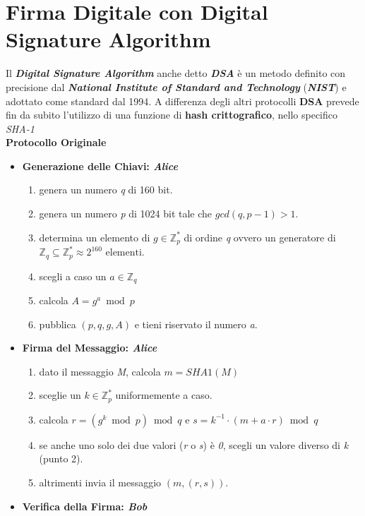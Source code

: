 \section{Firma Digitale con Digital Signature Algorithm}
Il \textbf{\textit{Digital Signature Algorithm}} anche detto \textbf{\textit{DSA}} è un metodo definito con precisione dal \textbf{\textit{National Institute of Standard and Technology}} (\textbf{\textit{NIST}}) e adottato come standard dal 1994. A differenza degli altri protocolli \textbf{DSA} prevede fin da subito l'utilizzo di una funzione di \textbf{hash crittografico}, nello specifico \textit{SHA-1}
\\ \newline
\textbf{Protocollo Originale}
\begin{itemize}
    \item \textbf{Generazione delle Chiavi: \textit{Alice}}
    \begin{enumerate}
        \item genera un numero \textit{q} di 160 bit.
        \item genera un numero \textit{p} di 1024 bit tale che $gcd(q, p - 1) > 1$.
        \item determina un elemento di $g \in \mathbb{Z}_p^*$ di ordine \textit{q} ovvero un generatore di $\mathbb{Z}_q \subseteq \mathbb{Z}_p^* \approx 2^{160} \text{ elementi}$.
        \item scegli a caso un $a \in \mathbb{Z}_q$
        \item calcola $A = g^a \bmod p$
        \item pubblica $(p, q, g, A)$ e tieni riservato il numero \textit{a}.
    \end{enumerate}
    \item \textbf{Firma del Messaggio: \textit{Alice}}
    \begin{enumerate}
        \item dato il messaggio \textit{M}, calcola $m = SHA1(M)$
        \item sceglie un $k \in \mathbb{Z}_p^*$ uniformemente a caso.
        \item calcola $r = (g^k \bmod p) \bmod q$ e $s = k^{-1} \cdot (m + a \cdot r) \bmod q$
        \item se anche uno solo dei due valori (\textit{r} o \textit{s}) è \textit{0}, scegli un valore diverso di \textit{k} (punto 2).
        \item altrimenti invia il messaggio $(m, (r, s))$.
    \end{enumerate}
    \item \textbf{Verifica della Firma: \textit{Bob}}

\end{itemize}
